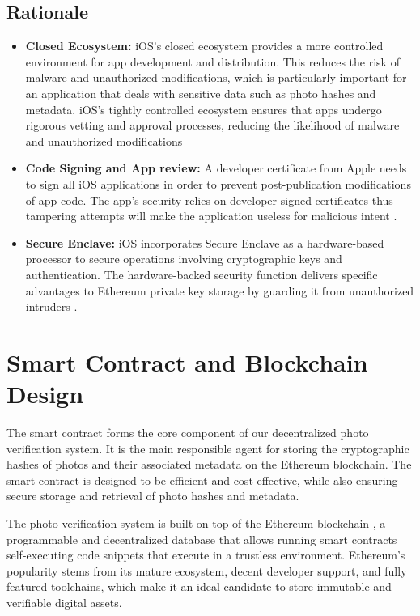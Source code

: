 \subsection{Rationale}
\begin{itemize}
    \item {\textbf{Closed Ecosystem:}} iOS's closed ecosystem provides a more controlled environment for app development and distribution. This reduces the risk of malware and unauthorized modifications, which is particularly important for an application that deals with sensitive data such as photo hashes and metadata. iOS’s tightly controlled ecosystem ensures that apps undergo rigorous vetting and approval processes, reducing the likelihood of malware and unauthorized modifications \cite{iosSecGarg}
    \item {\textbf{Code Signing and App review:}} A developer certificate from Apple needs to sign all iOS applications in order to prevent post-publication modifications of app code. The app's security relies on developer-signed certificates thus tampering attempts will make the application useless for malicious intent \cite{devCert}.
    \item {\textbf{Secure Enclave:}} iOS incorporates Secure Enclave as a hardware-based processor to secure operations involving cryptographic keys and authentication. The hardware-backed security function delivers specific advantages to Ethereum private key storage by guarding it from unauthorized intruders \cite{SecureEnclave2024}.
\end{itemize}


\section{Smart Contract and Blockchain Design}
The smart contract forms the core component of our decentralized photo verification system. It is the main responsible agent for storing the cryptographic hashes of photos and their associated metadata on the Ethereum blockchain. The smart contract is designed to be efficient and cost-effective, while also ensuring secure storage and retrieval of photo hashes and metadata.

The  photo verification system is built on top of the Ethereum blockchain \cite{ethereuem}, a programmable and decentralized database that allows running smart contracts self-executing code snippets that execute in a trustless environment. Ethereum's popularity stems from its mature ecosystem, decent developer support, and fully featured toolchains, which make it an ideal candidate to store immutable and verifiable digital assets.

